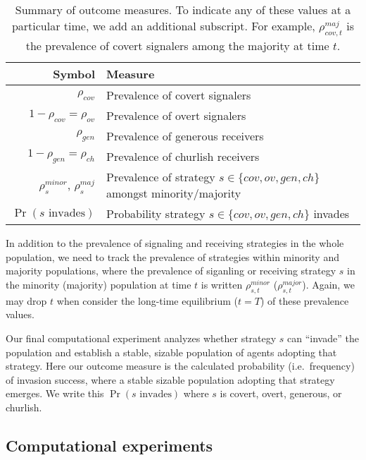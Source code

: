 \documentclass[11pt,letterpaper]{article}
\begin{document}
\begin{table}[H]
  \vspace{1em}
  \centering
  \begin{tabular}{rp{3in}} %
    Symbol & Measure \\ %
    \toprule
      $\rho_{cov}$ & Prevalence of covert signalers\\
    $1 - \rho_{cov} = \rho_{ov}$ & Prevalence of overt signalers  \\
     $\rho_{gen}$ & Prevalence of generous receivers \\
    $1 - \rho_{gen} = \rho_{ch}$ & Prevalence of churlish receivers \\
    $\rho_s^{minor}$, $\rho_s^{maj}$ & Prevalence of strategy $s \in \{cov, ov, gen, ch\}$ amongst minority/majority \\
    $\Pr(\text{$s$ invades})$ & Probability strategy $s \in \{cov, ov, gen, ch\}$ invades 
  \end{tabular}
  \caption{Summary of outcome measures. To indicate any of these values at
  a particular time, we add an additional subscript. For example, $\rho_{cov,t}^{maj}$
  is the prevalence of covert signalers among the majority at time $t$.}
  \label{tab:outcomeMeasures}
\end{table}

In addition to the prevalence of signaling and receiving strategies in the whole
population, we need to track the prevalence of strategies within  
minority and majority populations, where the prevalence of siganling or
receiving strategy $s$ in the minority (majority) population at time $t$ is written
$\rho_{s,t}^{minor}$ ($\rho_{s,t}^{major}$). Again, we may drop $t$ when 
consider the long-time equilibrium ($t=T$) of these prevalence values.

Our final computational experiment analyzes whether strategy $s$ can ``invade''
the population and establish a stable, sizable population of agents adopting
that strategy. Here our outcome measure is the calculated probability (i.e.\
frequency) of invasion success, where a stable sizable population adopting
that strategy emerges. We write this $\Pr(\text{$s$ invades})$ where $s$
is covert, overt, generous, or churlish.

\subsection{Computational experiments}
\end{document}
